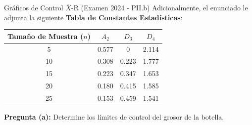 \begin{ejercicio}{Gráficos de Control $\bar{X}$-R (Examen 2024 - PII.b)}
Adicionalmente, el enunciado le adjunta la siguiente \textbf{Tabla de Constantes Estadísticas}:
\begin{center}
\scriptsize
\begin{tabular}{cccc}
\toprule
\textbf{Tamaño de Muestra ($n$)} & \textbf{$A_2$} & \textbf{$D_3$} & \textbf{$D_4$} \\
\midrule
5 & 0.577 & 0 & 2.114 \\
10 & 0.308 & 0.223 & 1.777 \\
15 & 0.223 & 0.347 & 1.653 \\
20 & 0.180 & 0.415 & 1.585 \\
25 & 0.153 & 0.459 & 1.541 \\
\bottomrule
\end{tabular}
\end{center}

\textbf{Pregunta (a):} Determine los límites de control del grosor de la botella.


\end{ejercicio}
